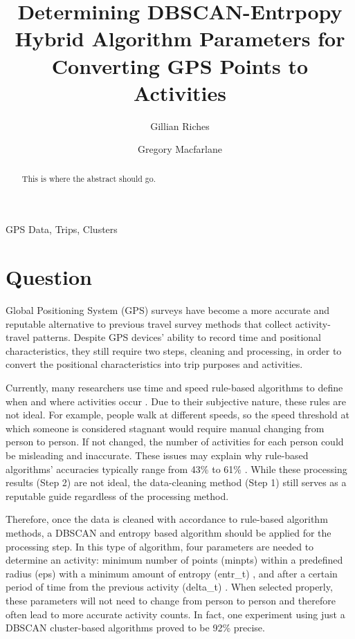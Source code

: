 \documentclass[3p, authoryear]{elsarticle} %
\begin{document}
\begin{frontmatter}

  \title{Determining DBSCAN-Entrpopy Hybrid Algorithm Parameters for Converting GPS Points to Activities}
    \author[Brigham Young University]{Gillian Riches}
    \author[Brigham Young University]{Gregory Macfarlane}
      \address[Brigham Young University]{Civil and Environmental Engineering Department, 232 Engineering Building, Provo, Utah 84602}
  
  \begin{abstract}
  This is where the abstract should go.
  \end{abstract}
   \begin{keyword} GPS Data, Trips, Clusters\end{keyword}
 \end{frontmatter}

\hypertarget{question}{%
\section{Question}\label{question}}

Global Positioning System (GPS) surveys have become a more accurate and reputable alternative to previous travel survey methods that collect activity-travel patterns. Despite GPS devices' ability to record time and positional characteristics, they still require two steps, cleaning and processing, in order to convert the positional characteristics into trip purposes and activities.

Currently, many researchers use time and speed rule-based algorithms to define when and where activities occur \citep{reviewOfMethods2014}. Due to their subjective nature, these rules are not ideal. For example, people walk at different speeds, so the speed threshold at which someone is considered stagnant would require manual changing from person to person. If not changed, the number of activities for each person could be misleading and inaccurate. These issues may explain why rule-based algorithms' accuracies typically range from 43\% to 61\% \citep{reviewOfMethods2014}. While these processing results (Step 2) are not ideal, the data-cleaning method (Step 1) still serves as a reputable guide regardless of the processing method.

Therefore, once the data is cleaned with accordance to rule-based algorithm methods, a DBSCAN and entropy based algorithm should be applied for the processing step. In this type of algorithm, four parameters are needed to determine an activity: minimum number of points (minpts) within a predefined radius (eps) with a minimum amount of entropy (entr\_t) \citep{GongInspiration}, and after a certain period of time from the previous activity (delta\_t) . When selected properly, these parameters will not need to change from person to person and therefore often lead to more accurate activity counts. In fact, one experiment \citep{DBAlgorithm2017} using just a DBSCAN cluster-based algorithms proved to be 92\% precise.
\end{document}
